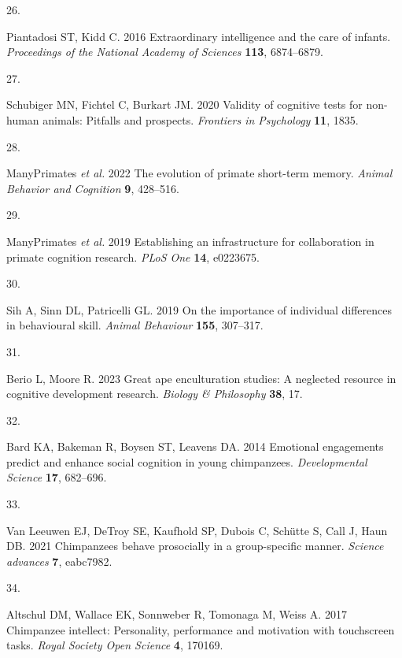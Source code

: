 \documentclass[
  man,floatsintext]{apa6}
\newlength{\cslhangindent}
\newlength{\csllabelwidth}
\newenvironment{CSLReferences}[2] %
 {\begin{list}{}{%
  \setlength{\itemindent}{0pt}
  \setlength{\leftmargin}{0pt}
  \setlength{\parsep}{0pt}
  \ifodd #1
   \setlength{\leftmargin}{\cslhangindent}
   \setlength{\itemindent}{-1\cslhangindent}
  \fi
  \setlength{\itemsep}{#2\baselineskip}}}
 {\end{list}}
\newcommand{\CSLLeftMargin}[1]{\parbox[t]{\csllabelwidth}{\strut#1\strut}}
\newcommand{\CSLRightInline}[1]{\parbox[t]{\linewidth - \csllabelwidth}{\strut#1\strut}}
\begin{document}
\begin{CSLReferences}{0}{1}
\CSLLeftMargin{26. }%
\CSLRightInline{Piantadosi ST, Kidd C. 2016 Extraordinary intelligence and the care of infants. \emph{Proceedings of the National Academy of Sciences} \textbf{113}, 6874--6879.}

\CSLLeftMargin{27. }%
\CSLRightInline{Schubiger MN, Fichtel C, Burkart JM. 2020 Validity of cognitive tests for non-human animals: Pitfalls and prospects. \emph{Frontiers in Psychology} \textbf{11}, 1835.}

\CSLLeftMargin{28. }%
\CSLRightInline{ManyPrimates \emph{et al.} 2022 The evolution of primate short-term memory. \emph{Animal Behavior and Cognition} \textbf{9}, 428--516.}

\CSLLeftMargin{29. }%
\CSLRightInline{ManyPrimates \emph{et al.} 2019 Establishing an infrastructure for collaboration in primate cognition research. \emph{PLoS One} \textbf{14}, e0223675.}

\CSLLeftMargin{30. }%
\CSLRightInline{Sih A, Sinn DL, Patricelli GL. 2019 On the importance of individual differences in behavioural skill. \emph{Animal Behaviour} \textbf{155}, 307--317.}

\CSLLeftMargin{31. }%
\CSLRightInline{Berio L, Moore R. 2023 Great ape enculturation studies: A neglected resource in cognitive development research. \emph{Biology \& Philosophy} \textbf{38}, 17.}

\CSLLeftMargin{32. }%
\CSLRightInline{Bard KA, Bakeman R, Boysen ST, Leavens DA. 2014 Emotional engagements predict and enhance social cognition in young chimpanzees. \emph{Developmental Science} \textbf{17}, 682--696.}

\CSLLeftMargin{33. }%
\CSLRightInline{Van Leeuwen EJ, DeTroy SE, Kaufhold SP, Dubois C, Schütte S, Call J, Haun DB. 2021 Chimpanzees behave prosocially in a group-specific manner. \emph{Science advances} \textbf{7}, eabc7982.}

\CSLLeftMargin{34. }%
\CSLRightInline{Altschul DM, Wallace EK, Sonnweber R, Tomonaga M, Weiss A. 2017 Chimpanzee intellect: Personality, performance and motivation with touchscreen tasks. \emph{Royal Society Open Science} \textbf{4}, 170169.}


\end{CSLReferences}
\end{document}
